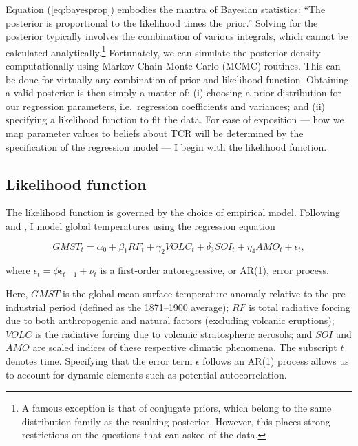 \documentclass[smallextended]{svjour3}       %
\begin{document}
Equation (\ref{eq:bayesprop}) embodies the mantra of Bayesian
statistics: ``The posterior is proportional to the likelihood times the
prior.'' Solving for the posterior typically involves the combination of
various integrals, which cannot be calculated analytically.\footnote{A
  famous exception is that of conjugate priors, which belong to the same
  distribution family as the resulting posterior. However, this places
  strong restrictions on the questions that can asked of the data.}
Fortunately, we can simulate the posterior density computationally using
Markov Chain Monte Carlo (MCMC) routines. This can be done for virtually
any combination of prior and likelihood function. Obtaining a valid
posterior is then simply a matter of: (i) choosing a prior distribution
for our regression parameters, i.e.~regression coefficients and
variances; and (ii) specifying a likelihood function to fit the data.
For ease of exposition --- how we map parameter values to beliefs about
TCR will be determined by the specification of the regression model ---
I begin with the likelihood function.

\hypertarget{sec:likelihood}{%
\subsection{Likelihood function}\label{sec:likelihood}}

The likelihood function is governed by the choice of empirical model.
Following \cite{estrada2012breaks} and \cite{estrada2013statistically},
I model global temperatures using the regression equation

\begin{equation}
   GMST_t = \alpha_0 + \beta_1RF_t + \gamma_2VOLC_t + \delta_3SOI_t + \eta_4AMO_t + \epsilon_t, \label{eq:regression}
\end{equation}

where \(\epsilon_t = \phi \epsilon_{t-1} + \nu_t\) is a first-order
autoregressive, or AR(1), error process.

Here, \(GMST\) is the global mean surface temperature anomaly relative
to the pre-industrial period (defined as the 1871--1900 average); \(RF\)
is total radiative forcing due to both anthropogenic and natural factors
(excluding volcanic eruptions); \(VOLC\) is the radiative forcing due to
volcanic stratospheric aerosols; and \(SOI\) and \(AMO\) are scaled
indices of these respective climatic phenomena. The subscript \(t\)
denotes time. Specifying that the error term \(\epsilon\) follows an
AR(1) process allows us to account for dynamic elements such as
potential autocorrelation.
\end{document}
